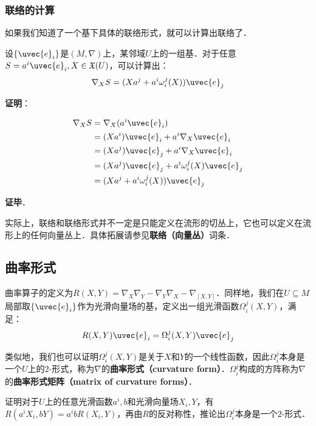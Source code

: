 \subsubsection{联络的计算}

如果我们知道了一个基下具体的联络形式，就可以计算出联络了．

\begin{theorem}{}
设$\{\uvec{e}_i\}$是$(M, \nabla)$上，某邻域$U$上的一组基．对于任意$S=a^i\uvec{e}_i, X\in\mathfrak{X}(U)$，可以计算出：
\begin{equation}
\nabla_XS=(Xa^j+a^i\omega^j_i(X))\uvec{e}_j
\end{equation}
\end{theorem}

\textbf{证明}：

\begin{equation}
\begin{aligned}
\nabla_XS&=\nabla_X(a^i\uvec{e}_i)\\
&=(Xa^i)\uvec{e}_i+a^i\nabla_X\uvec{e}_i\\
&=(Xa^j)\uvec{e}_j+a^i\nabla_X\uvec{e}_i\\
&=(Xa^j)\uvec{e}_j+a^i\omega^j_i(X)\uvec{e}_j\\
&=(Xa^j+a^i\omega^j_i(X))\uvec{e}_j
\end{aligned}
\end{equation}

\textbf{证毕}．

实际上，联络和联络形式并不一定是只能定义在流形的切丛上，它也可以定义在流形上的任何向量丛上．具体拓展请参见\textbf{联络（向量丛）}词条．

\subsection{曲率形式}

曲率算子的定义为$R(X, Y)=\nabla_X\nabla_Y-\nabla_Y\nabla_X-\nabla_{[X, Y]}$．同样地，我们在$U\subseteq M$局部取$\{\uvec{e}_i\}$作为光滑向量场的基，定义出一组光滑函数$\Omega^j_i(X, Y)$，满足：
\begin{equation}
R(X, Y)\uvec{e}_i=\Omega^j_i(X, Y)\uvec{e}_j
\end{equation}

类似地，我们也可以证明$\Omega^j_i(X, Y)$是关于$X$和$Y$的一个线性函数，因此$\Omega^j_i$本身是一个$U$上的$2$-形式，称为$\nabla$的\textbf{曲率形式（curvature form）}．$\Omega^j_i$构成的方阵称为$\nabla$的\textbf{曲率形式矩阵（matrix of curvature forms）}．

\begin{exercise}{}
证明对于$U$上的任意光滑函数$a^i, b$和光滑向量场$X_i, Y$，有$R(a^iX_i, bY)=a^ibR(X_i, Y)$，再由$R$的反对称性，推论出$\Omega^j_i$本身是一个$2$-形式．
\end{exercise}

